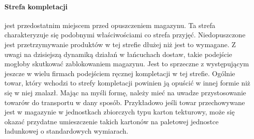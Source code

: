 		\paragraph{Strefa kompletacji} jest przedostatnim miejscem przed opuszczeniem magazynu. Ta strefa charakteryzuje się
		podobnymi właściwościami co strefa przyjęć. Niedopuszczone jest przetrzymywanie produktów w tej strefie dłużej niż jest 
		to wymagane. Z uwagi na dzisiejszą dynamiką działań w łańcuchach dostaw, takie podejście mogłoby skutkować zablokowaniem
		magazynu. Jest to sprzeczne z występującym jeszcze w wielu firmach podejściem ręcznej kompletacji w tej strefie. Ogólnie
		towar, który wchodzi to strefy kompletacji powinien ją opuścić w innej formie niż się w niej znalazł. Mając na myśli formę,
		należy mieć na uwadze przystosowanie towarów do transportu w dany sposób. Przykładowo jeśli towar przechowywane jest w magazynie
		w jednostkach zbiorczych typu karton tekturowy, może się okazać przydatne umieszczenie takich kartonów na paletowej 
		jednostce ładunkowej o standardowych wymiarach. 
